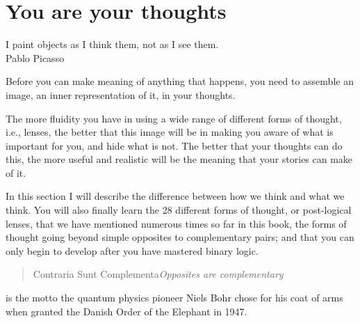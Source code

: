 ﻿%
\chapter{You are your thoughts}
\label{chapter:who-am-i-sense}


\begin{chapterquotation}
I paint objects as I think them, not as I see them. \\
\raggedleft\textemdash Pablo Picasso
\end{chapterquotation}




Before you can make meaning of anything that happens, you need to assemble an image, an inner representation of it, in your thoughts. 


The more fluidity you have in using a wide range of different forms of thought, i.e., lenses, the better that this image will be in making you aware of what is important for you, and hide what is not. The better that your thoughts can do this, the more useful and realistic will be the meaning that your stories can make of it.


In this section I will describe the difference between how we think and what we think. You will also finally learn the 28 different forms of thought, or post-logical lenses, that we have mentioned numerous times so far in this book, the forms of thought going beyond simple opposites to complementary pairs; and that you can only begin to develop after you have mastered binary logic.


\begin{quote} 
Contraria Sunt Complementa\textemdash \emph{Opposites are complementary}
\end{quote} 


is the motto the quantum physics pioneer Niels Bohr chose for his coat of arms when granted the Danish Order of the Elephant in 1947. 


